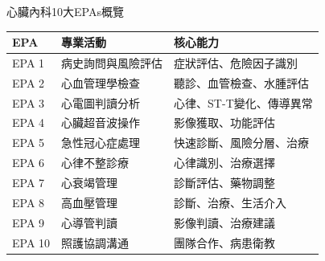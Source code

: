 \documentclass[aspectratio=169]{beamer}
\begin{document}
\begin{frame}{心臟內科10大EPAs概覽}
\scriptsize
\begin{table}
\centering
\begin{tabular}{p{}p{}p{}}
\hline
\textbf{EPA} & \textbf{專業活動} & \textbf{核心能力} \\
\hline
EPA 1 & 病史詢問與風險評估 & 症狀評估、危險因子識別 \\
\hline
EPA 2 & 心血管理學檢查 & 聽診、血管檢查、水腫評估 \\
\hline
EPA 3 & 心電圖判讀分析 & 心律、ST-T變化、傳導異常 \\
\hline
EPA 4 & 心臟超音波操作 & 影像獲取、功能評估 \\
\hline
EPA 5 & 急性冠心症處理 & 快速診斷、風險分層、治療 \\
\hline
EPA 6 & 心律不整診療 & 心律識別、治療選擇 \\
\hline
EPA 7 & 心衰竭管理 & 診斷評估、藥物調整 \\
\hline
EPA 8 & 高血壓管理 & 診斷、治療、生活介入 \\
\hline
EPA 9 & 心導管判讀 & 影像判讀、治療建議 \\
\hline
EPA 10 & 照護協調溝通 & 團隊合作、病患衛教 \\
\hline
\end{tabular}
\end{table}
\end{frame}
\end{document}
